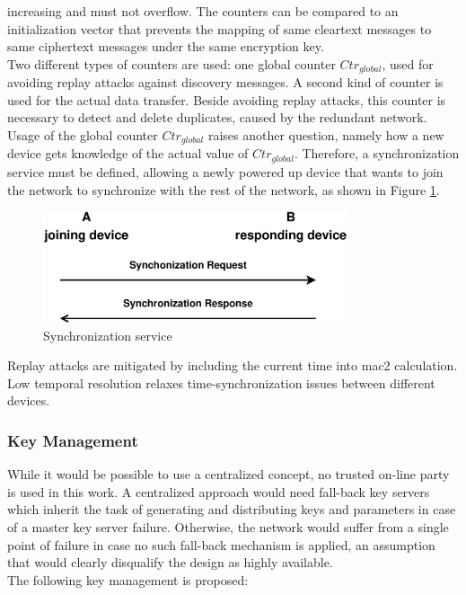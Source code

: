 increasing and must not overflow. The counters can be compared to an initialization vector that prevents the mapping of same cleartext messages to same ciphertext messages
under the same encryption key.
\\
Two different types of counters are used: one global counter $Ctr_{global}$, used for avoiding replay attacks against discovery messages. A second kind of counter
is used for the actual data transfer. Beside avoiding replay attacks, this counter is necessary to detect and delete duplicates, caused by the redundant network. 
\\
Usage of the global counter $Ctr_{global}$ raises another question, namely how a new device gets knowledge of the actual value of $Ctr_{global}$.
Therefore, a synchronization service must be defined, allowing a newly powered up device that wants to join the network to synchronize with the rest of the network, as shown in Figure \ref{fig:syncProt}.
\begin{figure}
  \centering
    \includegraphics[width=0.8\textwidth]{figures/protSync.eps}
 \caption{Synchronization service}
 \label{fig:syncProt}
\end{figure}
Replay attacks are mitigated by including the current time into \gls{mac2} calculation. Low temporal resolution relaxes time-synchronization issues between
different devices.

\subsubsection{Key Management}

While it would be possible to use a centralized concept, no trusted on-line party is used in this work. A centralized approach would need fall-back key servers
which inherit the task of generating and distributing keys and parameters in case of a master key server failure. Otherwise, the network would suffer from a
single point of failure in case no such fall-back mechanism is applied, an assumption that would clearly disqualify the design as highly available.
\\
The following key management is proposed:

